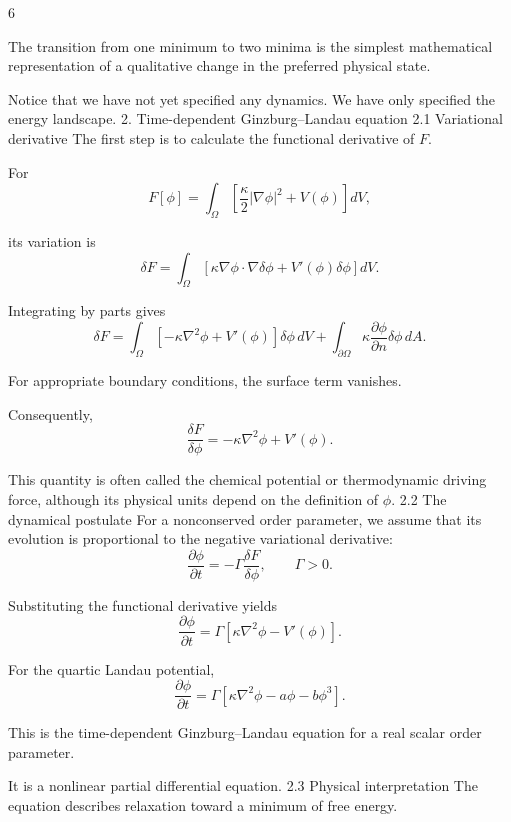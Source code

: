 6














The transition from one minimum to two minima is the simplest mathematical representation of a qualitative change in the preferred physical state.

Notice that we have not yet specified any dynamics. We have only specified the energy landscape.
2. Time-dependent Ginzburg–Landau equation
2.1 Variational derivative
The first step is to calculate the functional derivative of \(F\).

For
\[
F[\phi]=\int_\Omega
\left[
\frac{\kappa}{2}|\nabla\phi|^2+V(\phi)
\right]dV,
\]

its variation is
\[
\delta F=
\int_\Omega
\left[
\kappa\nabla\phi\cdot\nabla\delta\phi
+V'(\phi)\delta\phi
\right]dV.
\]

Integrating by parts gives
\[
\delta F=
\int_\Omega
\left[
-\kappa\nabla^2\phi+V'(\phi)
\right]\delta\phi\,dV
+
\int_{\partial\Omega}
\kappa\frac{\partial\phi}{\partial n}
\delta\phi\,dA.
\]

For appropriate boundary conditions, the surface term vanishes.

Consequently,
\[
\boxed{
\frac{\delta F}{\delta\phi}
=
-\kappa\nabla^2\phi+V'(\phi).
}
\]

This quantity is often called the chemical potential or thermodynamic driving force, although its physical units depend on the definition of \(\phi\).
2.2 The dynamical postulate
For a nonconserved order parameter, we assume that its evolution is proportional to the negative variational derivative:
\[
\boxed{
\frac{\partial\phi}{\partial t}
=
-\Gamma\frac{\delta F}{\delta\phi},
\qquad \Gamma>0.
}
\]

Substituting the functional derivative yields
\[
\boxed{
\frac{\partial\phi}{\partial t}
=
\Gamma\left[
\kappa\nabla^2\phi-V'(\phi)
\right].
}
\]

For the quartic Landau potential,
\[
\boxed{
\frac{\partial\phi}{\partial t}
=
\Gamma\left[
\kappa\nabla^2\phi-a\phi-b\phi^3
\right].
}
\]

This is the time-dependent Ginzburg–Landau equation for a real scalar order parameter.

It is a nonlinear partial differential equation.
2.3 Physical interpretation
The equation describes relaxation toward a minimum of free energy.

